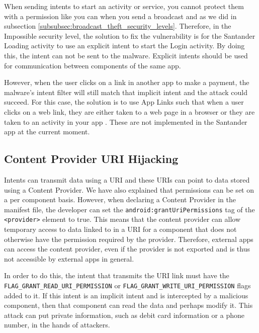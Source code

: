     When sending intents to start an activity or service, you cannot protect them with a permission like you can when you send a broadcast and as we did in subsection \ref{subsubsec:broadcast_theft_security_levels}. Therefore, in the Impossible security level, the solution to fix the vulnerability is for the Santander Loading activity to use an explicit intent to start the Login activity. By doing this, the intent can not be sent to the malware. Explicit intents should be used for communication between components of the same app.

    However, when the user clicks on a link in another app to make a payment, the malware's intent filter will still match that implicit intent and the attack could succeed. For this case, the solution is to use App Links such that when a user clicks on a web link, they are either taken to a web page in a browser or they are taken to an activity in your app \cite{android_app_links}. These are not implemented in the Santander app at the current moment.
    
    \subsection{Content Provider URI Hijacking}
        \label{subsec:provider_uri_hijacking}
        
   Intents can transmit data using a URI and these URIs can point to data stored using a Content Provider. We have also explained that permissions can be set on a per component basis. However, when declaring a Content Provider in the manifest file, the developer can set the \lstinline|android:grantUriPermissions| tag of the \lstinline|<provider>| element to true. This means that the content provider can allow temporary access to data linked to in a URI for a component that does not otherwise have the permission required by the provider. Therefore, external apps can access the content provider, even if the provider is not exported and is thus not accessible by external apps in general.
    
    In order to do this, the intent that transmits the URI link must have the \lstinline|FLAG_GRANT_READ_URI_PERMISSION| or \lstinline|FLAG_GRANT_WRITE_URI_PERMISSION| flags added to it. If this intent is an implicit intent and is intercepted by a malicious component, then that component can read the data and perhaps modify it. This attack can put private information, such as debit card information or a phone number, in the hands of attackers.
    